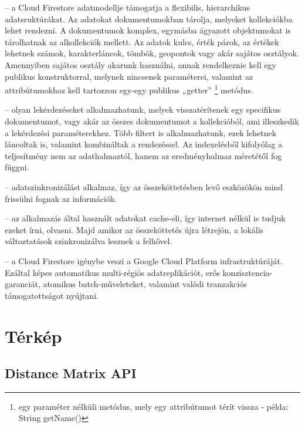 \begin{description}
	\setlength{\itemsep}{0.04mm}
	\item[Flexibilitás] -- a Cloud Firestore adatmodellje támogatja a flexibilis, hierarchikus adatsruktúrákat. Az adatokat dokumentumokban tárolja, melyeket kollekciókba lehet rendezni. A dokumentumok komplex, egymásba ágyazott objektumokat is tárolhatnak az alkollekciók mellett. Az adatok kulcs, érték párok, az értékek lehetnek számok, karakterláncok, tömbök, geopontok vagy akár sajátos osztályok. Amennyiben sajátos osztály akarunk használni, annak rendelkeznie kell egy publikus konstruktorral, melynek nincsenek paraméterei, valamint az attribútumokhoz kell tartozzon egy-egy publikus „getter”%
	\footnote{ %
		egy paraméter nélküli metódus, mely egy attribútumot térít vissza - példa: String getName()
	}  %
	metódus.
	\item[Kifejező lekérdezés] -- olyan lekérdezéseket alkalmazhatunk, melyek visszatérítenek egy specifikus dokumentumot, vagy akár az összes dokumentumot a kollekcióból, ami illeszkedik a lekérdezési paraméterekhez. Több filtert is alkalmazhatunk, ezek lehetnek láncoltak is, valamint kombináltak a rendezéssel. Az indexelésből kifolyólag a teljesítmény nem az adathalmaztól, hanem az eredményhalmaz méretétől fog függni.
	\item[Valós idejű frissítések] -- adatszinkronizálást alkalmaz, így az összeköttetésben levő eszközökön mind frissülni fognak az információk.
	\item[Offline támogatás] -- az alkalmazás által használt adatokat cache-eli, így internet nélkül is tudjuk ezeket írni, olvasni. Majd amikor az összeköttetés újra létrejön, a lokális változtatások szinkronizálva lesznek a felhővel.
	\item[Skálázhatóság] -- a Cloud Firestore igénybe veszi a Google Cloud Platform infrastruktúráját. Ezáltal képes automatikus multi-régiós adatreplikációt, erős konzisztencia-garanciát, atomikus batch-műveleteket, valamint valódi tranzakciós támogatottságot nyújtani. 
\end{description}


\section{Térkép}

\subsection{Distance Matrix API}

